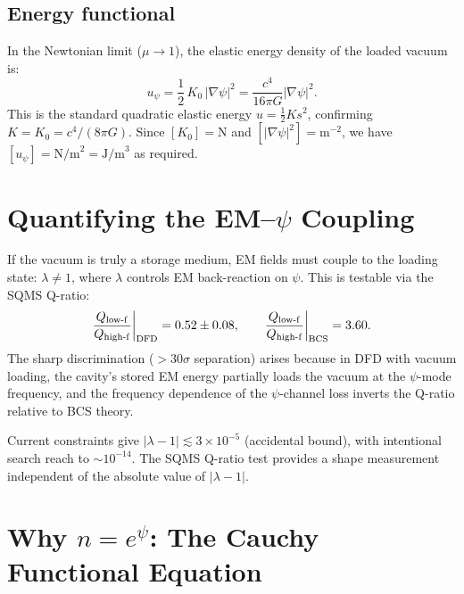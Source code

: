 \documentclass[aps,prd,twocolumn,superscriptaddress,nofootinbib]{revtex4-2}
\begin{document}
\subsection{Energy functional}

In the Newtonian limit ($\mu \to 1$), the elastic energy density of
the loaded vacuum is:
\begin{equation}
u_\psi = \frac{1}{2}\,K_0\,|\nabla\psi|^2
= \frac{c^4}{16\pi G}|\nabla\psi|^2.
\label{eq:energy-density}
\end{equation}
This is the standard quadratic elastic energy
$u = \frac{1}{2}K s^2$, confirming $K = K_0 = c^4/(8\pi G)$.
Since $[K_0] = \text{N}$ and $[|\nabla\psi|^2] = \text{m}^{-2}$,
we have $[u_\psi] = \text{N/m}^2 = \text{J/m}^3$ as required.


\section{Quantifying the EM--$\psi$ Coupling}
\label{sec:em-coupling}

If the vacuum is truly a storage medium, EM fields must couple to the
loading state: $\lambda \neq 1$, where $\lambda$ controls EM
back-reaction on $\psi$.  This is testable via the SQMS Q-ratio:
\begin{equation}
\frac{Q_{\rm low\text{-}f}}{Q_{\rm high\text{-}f}}\bigg|_{\rm DFD}
= 0.52 \pm 0.08,
\qquad
\frac{Q_{\rm low\text{-}f}}{Q_{\rm high\text{-}f}}\bigg|_{\rm BCS}
= 3.60.
\label{eq:Q-ratio}
\end{equation}
The sharp discrimination ($>30\sigma$ separation) arises because in
DFD with vacuum loading, the cavity's stored EM energy partially loads
the vacuum at the $\psi$-mode frequency, and the frequency dependence
of the $\psi$-channel loss inverts the Q-ratio relative to BCS theory.

Current constraints give
$|\lambda - 1| \lesssim 3 \times 10^{-5}$ (accidental bound),
with intentional search reach to $\sim 10^{-14}$.  The SQMS Q-ratio
test provides a shape measurement independent of the absolute value
of $|\lambda - 1|$.


\section{Why $n = e^\psi$: The Cauchy Functional Equation}
\label{sec:exponential}
\end{document}
